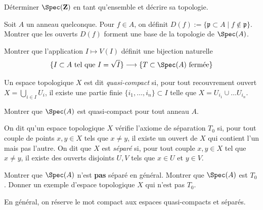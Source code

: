\begin{exercise}
\label{exercise-spec-Z}
Déterminer $\Spec(\mathbf{Z})$ en tant qu'ensemble et décrire sa topologie.
\end{exercise}

\begin{exercise}
\label{exercise-basis-opens-standard}
Soit $A$ un anneau quelconque. Pour $f\in A$, on définit
$D(f):= \{\mathfrak p \subset A \mid f \not \in \mathfrak p\}$.
Montrer que les ouverts $D(f)$ forment une base de la topologie de
$\Spec(A)$.
\end{exercise}

\begin{exercise}
\label{exercise-radical-ideals-closed}
Montrer que l'application $I\mapsto V(I)$
définit une bijection naturelle
$$
\{I\subset A\text{ tel que }I = \sqrt{I}\}
\longrightarrow
\{T\subset \Spec(A)\text{ fermée}\}
$$
\end{exercise}

\begin{definition}
\label{definition-quasi-compact}
Un espace topologique $X$ est dit {\it quasi-compact}
si, pour tout recouvrement ouvert $X = \bigcup_{i\in I} U_i$, il existe une
partie finie $\{i_1, \ldots, i_n\}\subset I$ telle que $X = U_{i_1}\cup\ldots
U_{i_n}$.
\end{definition}

\begin{exercise}
\label{exercise-spec-quasi-compact}
Montrer que $\Spec(A)$ est quasi-compact pour tout anneau $A$.
\end{exercise}

\begin{definition}
\label{definition-Hausdorff}
On dit qu'un espace topologique $X$ vérifie l'axiome de séparation $T_0$
si, pour tout couple de points $x, y\in X$ tels que $x\not = y$, il existe un
ouvert de $X$ qui contient l'un mais pas l'autre.
On dit que $X$ est {\it séparé} si, pour tout couple $x, y\in X$ tel que $x\not = y$,
il existe des ouverts disjoints $U, V$ tels que $x\in U$
et $y\in V$.
\end{definition}

\begin{exercise}
\label{exercise-not-hausdorff}
Montrer que $\Spec(A)$ n'est {\bf pas} séparé en général.
Montrer que $\Spec(A)$ est $T_0$. Donner un exemple d'espace topologique
$X$ qui n'est pas $T_0$.
\end{exercise}

\begin{remark}
\label{remark-not-hausdorff}
En général, on réserve le mot compact aux espaces quasi-compacts et
séparés.
\end{remark}

